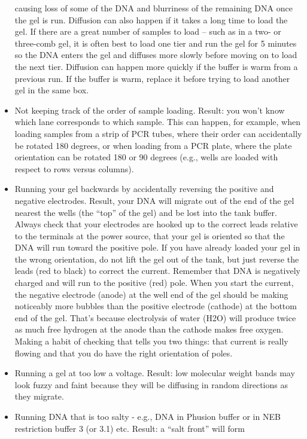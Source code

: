\documentclass[
  letterpaper,
  DIV=11,
  numbers=noendperiod]{scrreprt}
\begin{document}
\begin{itemize}
  causing loss of some of the DNA and blurriness of the remaining DNA
  once the gel is run. Diffusion can also happen if it takes a long time
  to load the gel. If there are a great number of samples to load --
  such as in a two- or three-comb gel, it is often best to load one tier
  and run the gel for 5 minutes so the DNA enters the gel and diffuses
  more slowly before moving on to load the next tier. Diffusion can
  happen more quickly if the buffer is warm from a previous run. If the
  buffer is warm, replace it before trying to load another gel in the
  same box.
\item
  Not keeping track of the order of sample loading. Result: you won't
  know which lane corresponds to which sample. This can happen, for
  example, when loading samples from a strip of PCR tubes, where their
  order can accidentally be rotated 180 degrees, or when loading from a
  PCR plate, where the plate orientation can be rotated 180 or 90
  degrees (e.g., wells are loaded with respect to rows versus columns).
\item
  Running your gel backwards by accidentally reversing the positive and
  negative electrodes. Result, your DNA will migrate out of the end of
  the gel nearest the wells (the ``top'' of the gel) and be lost into
  the tank buffer. Always check that your electrodes are hooked up to
  the correct leads relative to the terminals at the power source, that
  your gel is oriented so that the DNA will run toward the positive
  pole. If you have already loaded your gel in the wrong orientation, do
  not lift the gel out of the tank, but just reverse the leads (red to
  black) to correct the current. Remember that DNA is negatively charged
  and will run to the positive (red) pole. When you start the current,
  the negative electrode (anode) at the well end of the gel should be
  making noticeably more bubbles than the positive electrode (cathode)
  at the bottom end of the gel. That's because electrolysis of water
  (H2O) will produce twice as much free hydrogen at the anode than the
  cathode makes free oxygen. Making a habit of checking that tells you
  two things: that current is really flowing and that you do have the
  right orientation of poles.
\item
  Running a gel at too low a voltage. Result: low molecular weight bands
  may look fuzzy and faint because they will be diffusing in random
  directions as they migrate.
\item
  Running DNA that is too salty - e.g., DNA in Phusion buffer or in NEB
  restriction buffer 3 (or 3.1) etc. Result: a ``salt front'' will form

\end{itemize}
\end{document}
